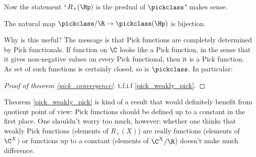 Now the statement ``$R_{+}(\Hp)$ is the predual of $\pickclass$" makes sense.

\begin{lause}\label{pick_weakly_pick}
	The natural map $\pickclass/\R \to \pickclass(\Hp)$ is bijection.
\end{lause}

Why is this useful? The message is that Pick functions are completely determined by Pick functionals. If function on $\C$ looks like a Pick function, in the sense that it gives non-negative values on every Pick functional, then it is a Pick function. As set of such functions is certainly closed, so is $\pickclass$. In particular:

\begin{proof}[Proof of theorem \ref{pick_convergence}]
	t.f.i.f \ref{pick_weakly_pick}.
\end{proof}

Theorem \ref{pick_weakly_pick} is kind of a result that would definitely benefit from quotient point of view: Pick functions should be defined up to a constant in the first place. One shouldn't worry too much, however: whether one thinks that weakly Pick functions (elements of $R_{+}(X)$) are really functions (elements of $\C^{X}$) or functions up to a constant (elements of $\C^{X}/\R$) doesn't make much difference.

